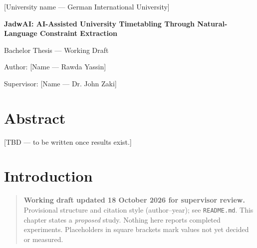 \documentclass[
  11pt,a4paper,oneside]{report}
\author{}
\date{}
\begin{document}
\begin{titlepage}
\centering
{\large [University name --- German International University]\par{}\par}
\vspace{2.5cm}
{\Huge\bfseries JadwAI: AI-Assisted University Timetabling Through Natural-Language Constraint Extraction\par}
\vspace{1.5cm}
{\Large Bachelor Thesis --- Working Draft\par}
\vspace{2cm}
{\large Author: [Name --- Rawda Yassin]\par Supervisor: [Name --- Dr. John Zaki]\par [Month Year --- TBD]\par}
\vfill
{}
\end{titlepage}
\chapter*{Abstract}
[TBD --- to be written once results exist.]
\tableofcontents
\clearpage

\hypertarget{introduction}{%
\chapter{Introduction}\label{introduction}}

\begin{quote}
\textbf{Working draft updated 18 October 2026 for supervisor review.} Provisional structure and
citation style (author--year); see \texttt{README.md}. This chapter
states a \emph{proposed} study. Nothing here reports completed
experiments. Placeholders in square brackets mark values not yet decided
or measured.
\end{quote}
\end{document}
